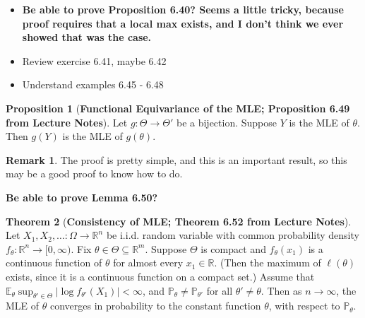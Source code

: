 \documentclass{article}
\newcommand{\E}{\mathbb{E}}
\theoremstyle{definition}
\newtheorem{theorem}{Theorem}
\theoremstyle{definition}
\newtheorem{proposition}[theorem]{Proposition}
\theoremstyle{definition}
\theoremstyle{definition}
\theoremstyle{definition}
\newtheorem*{remark}{Remark}
\theoremstyle{definition}
\theoremstyle{definition}
\begin{document}
\begin{itemize}

\item \textbf{Be able to prove Proposition 6.40? Seems a little tricky, because proof requires that a local max exists, and I don't think we ever showed that was the case.}

\item Review exercise 6.41, maybe 6.42

\item Understand examples 6.45 - 6.48

\end{itemize}

\begin{proposition}[\textbf{Functional Equivariance of the MLE; Proposition 6.49 from Lecture Notes}]Let \(g:\Theta \to \Theta'\) be a bijection. Suppose \(Y\) is the MLE of \(\theta\). Then \(g(Y)\) is the MLE of \(g(\theta)\).

\end{proposition}

\begin{remark}The proof is pretty simple, and this is an important result, so this may be a good proof to know how to do.

\end{remark}

\textbf{Be able to prove Lemma 6.50?}

\begin{theorem}[\textbf{Consistency of MLE; Theorem 6.52 from Lecture Notes}]Let \(X_1, X_2, \ldots : \Omega \to \mathbb{R}^n\) be i.i.d. random variable with common probability density \(f_\theta: \mathbb{R}^n \to [0, \infty)\). Fix \(\theta \in \Theta \subseteq \mathbb{R}^m\). Suppose \(\Theta\) is compact and \(f_\theta(x_1)\) is a continuous function of \(\theta\) for almost every \(x_1 \in \mathbb{R}\). (Then the maximum of \(\ell(\theta)\) exists, since it is a continuous function on a compact set.) Assume that \(\E_\theta \sup_{\theta' \in \Theta} | \log f_{\theta '} (X_1)| < \infty\), and \(\mathbb{P}_\theta \neq \mathbb{P}_{\theta'}\) for all \(\theta' \neq \theta\). Then as \(n \to \infty\), the MLE of \(\theta\) converges in probability to the constant function \(\theta\), with respect to \(\mathbb{P}_\theta\).

\end{theorem}
\end{document}
